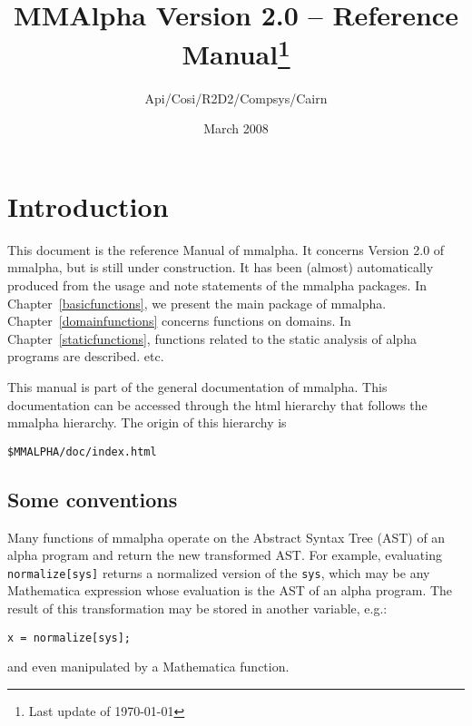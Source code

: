 \documentclass[11pt]{report}
\newcommand{\MMAlpha}{{\sc mmalpha}}
\newcommand{\Alfa}{{\sc alpha}}
\newcommand{\mma}{{\sc Mathematica}}
\newcommand{\alfa}{{\sc alpha}}
\begin{document}
 
\pagestyle{headings}
\thispagestyle{empty}
\title{MMAlpha Version 2.0 -- Reference Manual\thanks{Last update of
\today{}}} 
\author{Api/Cosi/R2D2/Compsys/Cairn}

\date{March 2008} 

\maketitle 

\tableofcontents 

\newpage 
\chapter{Introduction}
This document is the reference Manual of \MMAlpha{}. It concerns
Version 2.0 of \MMAlpha{}, but is still under construction.
It has been
(almost) automatically produced from the usage and note statements
of the \MMAlpha{} packages. In Chapter~\ref{basicfunctions}, we present
the main package of \MMAlpha{}. 
Chapter~\ref{domainfunctions} concerns
functions on domains. In Chapter~\ref{staticfunctions}, functions 
related to the static analysis of \alfa{} programs are described.
etc.

This manual is part of the general documentation of \MMAlpha{}.
This documentation can be accessed through the html hierarchy 
that follows the \MMAlpha{} hierarchy. The origin of this 
hierarchy is
\begin{verbatim}
$MMALPHA/doc/index.html
\end{verbatim}
\section*{Some conventions}
Many functions of \MMAlpha{} operate on the Abstract Syntax Tree (AST) of
an \alfa{} program and return the new transformed AST. For example, 
evaluating \texttt{normalize[sys]} returns a normalized version of 
the \texttt{sys}, which may be any \mma{} expression whose evaluation
is the AST of an \Alfa{} program. The result of this transformation may
be stored in another variable, e.g.:
\begin{verbatim}
x = normalize[sys];
\end{verbatim}
and even manipulated by a \mma{} function. 
\end{document}
